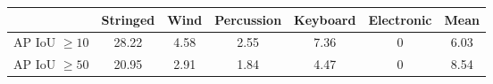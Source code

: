 \begin{tabular}{c|c|c|c|c|c||c}\hline
		& Stringed & Wind & Percussion & Keyboard & Electronic & Mean\\ \hline \hline 
	AP IoU $\geq10$ & 28.22         & 4.58      & 2.55           & 7.36  & 0   &  6.03  \\
	AP IoU $\geq50$ & 20.95         &  2.91    &  1.84          &  4.47       & 0 & 8.54 
\end{tabular}
